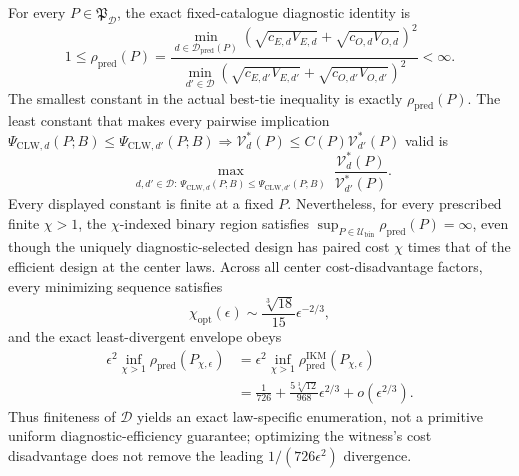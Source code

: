 For every \(P\in\mathfrak P_{\mathcal D}\), the exact fixed-catalogue diagnostic identity is
\[
 1\le\rho_{\mathrm{pred}}(P)
 =\frac{\min_{d\in\mathcal D_{\mathrm{pred}}(P)}
 (\sqrt{c_{E,d}V_{E,d}}+\sqrt{c_{O,d}V_{O,d}})^2}
 {\min_{d'\in\mathcal D}
 (\sqrt{c_{E,d'}V_{E,d'}}+\sqrt{c_{O,d'}V_{O,d'}})^2}<\infty.
\]
The smallest constant in the actual best-tie inequality is exactly \(\rho_{\mathrm{pred}}(P)\). The least constant that makes every pairwise implication
\(\Psi_{\mathrm{CLW},d}(P;B)\le\Psi_{\mathrm{CLW},d'}(P;B)\Rightarrow \mathcal V_d^*(P)\le C(P)\mathcal V_{d'}^*(P)\)
valid is
\[
 \max_{\substack{d,d'\in\mathcal D:\,
 \Psi_{\mathrm{CLW},d}(P;B)\le\Psi_{\mathrm{CLW},d'}(P;B)}}
 \frac{\mathcal V_d^*(P)}{\mathcal V_{d'}^*(P)}.
\]
Every displayed constant is finite at a fixed \(P\). Nevertheless, for every prescribed finite \(\chi>1\), the \(\chi\)-indexed binary region satisfies \(\sup_{P\in\mathcal U_{\mathrm{bin}}}\rho_{\mathrm{pred}}(P)=\infty\), even though the uniquely diagnostic-selected design has paired cost \(\chi\) times that of the efficient design at the center laws. Across all center cost-disadvantage factors, every minimizing sequence satisfies
\[
 \chi_{\mathrm{opt}}(\epsilon)
 \sim\frac{\sqrt[3]{18}}{15}\epsilon^{-2/3},
\]
and the exact least-divergent envelope obeys
\[
\begin{aligned}
 \epsilon^2\inf_{\chi>1}\rho_{\mathrm{pred}}(P_{\chi,\epsilon})
 &=\epsilon^2\inf_{\chi>1}\rho_{\mathrm{pred}}^{\mathrm{IKM}}(P_{\chi,\epsilon})\\
 &=\frac1{726}+\frac{5\sqrt[3]{12}}{968}\epsilon^{2/3}
 +o(\epsilon^{2/3}).
\end{aligned}
\]
Thus finiteness of \(\mathcal D\) yields an exact law-specific enumeration, not a primitive uniform diagnostic-efficiency guarantee; optimizing the witness's cost disadvantage does not remove the leading \(1/(726\epsilon^2)\) divergence.